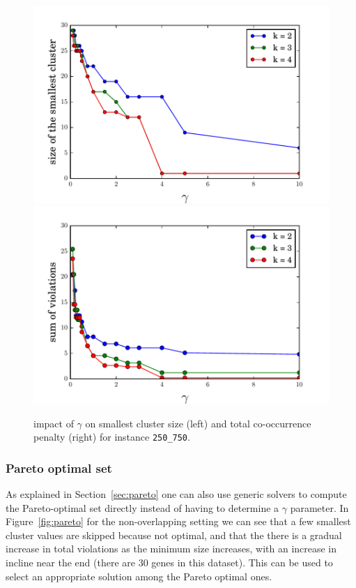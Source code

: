 \documentclass[conference]{IEEEtran}
\begin{document}
\begin{figure}[b]
\centering
\includegraphics[scale=0.28]{images/clsize}
\includegraphics[scale=0.28]{images/penalty}
\captionsetup{font=small}
\caption{impact of $\gamma$ on smallest cluster size (left) and total co-occurrence penalty (right) for instance \texttt{250\_750}.}
\label{fig:gamma}
\end{figure}

\subsubsection{Pareto optimal set}
As explained in Section~\ref{sec:pareto} one can also use generic solvers to compute the Pareto-optimal set directly instead of having to determine a $\gamma$ parameter. In Figure~\ref{fig:pareto} for the non-overlapping setting we can see that a few smallest cluster values are skipped because not optimal, and that the there is a gradual increase in total violations as the minimum size increases, with an increase in incline near the end (there are 30 genes in this dataset). This can be used to select an appropriate solution among the Pareto optimal ones.
\end{document}
